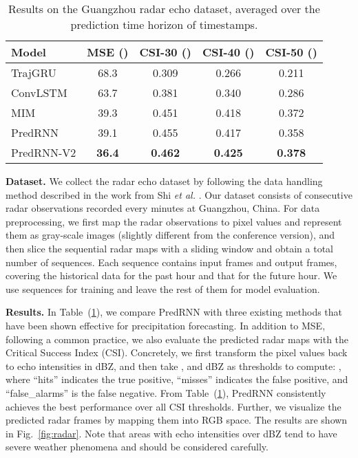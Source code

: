 \documentclass[10pt,journal,compsoc]{IEEEtran}
\let\MYoriglatexcaption\caption
\renewcommand{\caption}[2][\relax]{\MYoriglatexcaption[#2]{#2}}
\newcommand{\tab}[1]{Table~(\ref{#1})}
\newcommand{\fig}[1]{Fig.~\ref{#1}}
\newcommand{\myparagraph}[1]{\vspace{5pt} \noindent \textbf{#1.}}
\begin{document}
\begin{table}[b]
\caption{Results on the Guangzhou radar echo dataset, averaged over the prediction time horizon of  timestamps.
  }
  \vskip -0.05in
  \label{tab:radar}
  \centering
  \begin{tabular}{lcccc}
    \toprule
    Model & MSE () & CSI-30 () & CSI-40 () & CSI-50 () \\
    \midrule
    TrajGRU \cite{shi2017deep} & 68.3 & 0.309 & 0.266 & 0.211 \\
    ConvLSTM \cite{shi2015convolutional}  & 63.7 & 0.381 & 0.340 & 0.286  \\
    MIM \cite{wang2019memory} & 39.3 & 0.451 & 0.418 & 0.372 \\
    \midrule
    PredRNN & 39.1 & 0.455 & 0.417 & 0.358  \\
    PredRNN-V2 & \textbf{36.4} & \textbf{0.462} & \textbf{0.425} & \textbf{0.378} \\
    \bottomrule
  \end{tabular}
\end{table}

\myparagraph{Dataset} 
We collect the radar echo dataset by following the data handling method described in the work from Shi \textit{et al.} \cite{shi2015convolutional}. 
Our dataset consists of  consecutive radar observations recorded every  minutes at Guangzhou, China.
For data preprocessing, we first map the radar observations to pixel values and represent them as  gray-scale images (slightly different from the conference version), and then slice the sequential radar maps with a sliding window and obtain a total number of  sequences. Each sequence contains  input frames and  output frames, covering the historical data for the past hour and that for the future hour. We use  sequences for training and leave the rest of them for model evaluation.


\myparagraph{Results} 
In \tab{tab:radar}, we compare PredRNN with three existing methods that have been shown effective for precipitation forecasting.
In addition to MSE, following a common practice, we also evaluate the predicted radar maps with the Critical Success Index (CSI). Concretely, we first transform the pixel values back to echo intensities in dBZ, and then take ,  and  dBZ as thresholds to compute: , where ``hits'' indicates the true positive, ``misses'' indicates the false positive, and ``false\_alarms'' is the false negative.
From \tab{tab:radar}, PredRNN consistently achieves the best performance over all CSI thresholds.
Further, we visualize the predicted radar frames by mapping them into RGB space. The results are shown in \fig{fig:radar}. Note that areas with echo intensities over  dBZ tend to have severe weather phenomena and should be considered carefully. 
\end{document}

